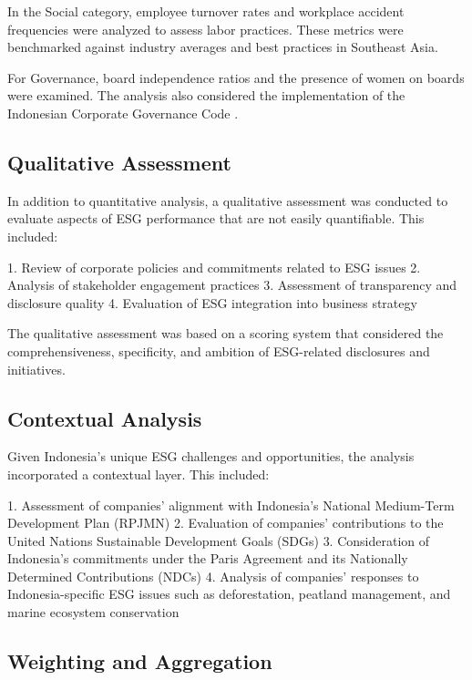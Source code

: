 In the Social category, employee turnover rates and workplace accident frequencies were analyzed to assess labor practices. These metrics were benchmarked against industry averages and best practices in Southeast Asia.

For Governance, board independence ratios and the presence of women on boards were examined. The analysis also considered the implementation of the Indonesian Corporate Governance Code \cite{IDXCGC2020}.

\subsection{Qualitative Assessment}

In addition to quantitative analysis, a qualitative assessment was conducted to evaluate aspects of ESG performance that are not easily quantifiable. This included:

1. Review of corporate policies and commitments related to ESG issues
2. Analysis of stakeholder engagement practices
3. Assessment of transparency and disclosure quality
4. Evaluation of ESG integration into business strategy

The qualitative assessment was based on a scoring system that considered the comprehensiveness, specificity, and ambition of ESG-related disclosures and initiatives.

\subsection{Contextual Analysis}

Given Indonesia's unique ESG challenges and opportunities, the analysis incorporated a contextual layer. This included:

1. Assessment of companies' alignment with Indonesia's National Medium-Term Development Plan (RPJMN) \cite{Bappenas2020}
2. Evaluation of companies' contributions to the United Nations Sustainable Development Goals (SDGs) \cite{UNSDGS2022}
3. Consideration of Indonesia's commitments under the Paris Agreement and its Nationally Determined Contributions (NDCs) \cite{IndonesiaNDC2021}
4. Analysis of companies' responses to Indonesia-specific ESG issues such as deforestation, peatland management, and marine ecosystem conservation

\subsection{Weighting and Aggregation}

